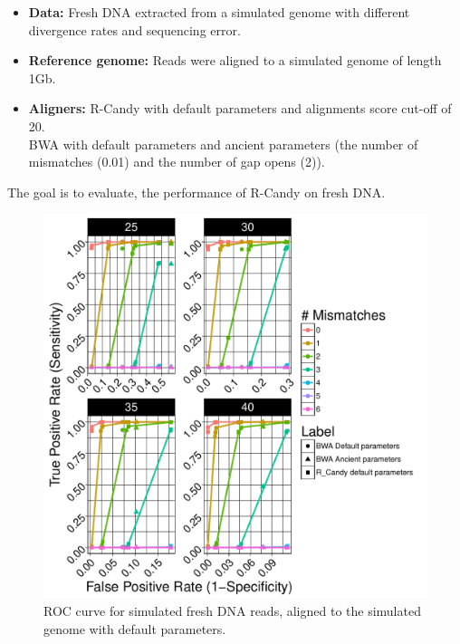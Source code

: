 \documentclass[11pt,a4paper]{report}
\begin{document}
  \begin{itemize}

   \item \textbf{Data:} Fresh DNA extracted from a simulated genome 
   with different divergence rates and sequencing error.

   \item \textbf{Reference genome:} Reads were aligned to a simulated genome of 
length 1Gb.

    \item \textbf{Aligners:} 
R-Candy with default parameters and alignments score cut-off of 20. \\
BWA with default parameters and ancient parameters (the number of mismatches 
(0.01) and the number of gap opens (2)).

  \end{itemize}
 
The goal is to evaluate, the performance of R-Candy on fresh DNA.

\begin{figure}[H]
\centering
\includegraphics[width=12cm]{pictures/ROC_DS3_emp.pdf}
\caption{ROC curve for simulated fresh DNA reads, aligned to the simulated genome
         with default parameters.}
\label{DS3_emp}
\end{figure}
\end{document}
